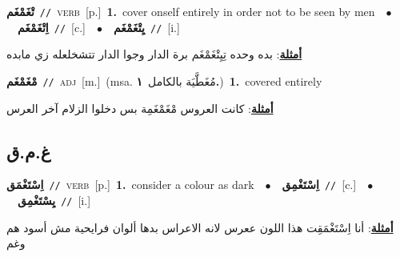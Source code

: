 \documentclass[10pt,a4paper,twoside]{article} %
\begin{document}
\begin{multicols}{2}
{\setlength\topsep{0pt}\textbf{\foreignlanguage{arabic}{تْغَمْغَم}}\ {\color{gray}\texttt{//}\color{black}}\ \textsc{verb}\ [p.]\ \textbf{1.}~cover onself entirely in order not to be seen by men\ \ $\bullet$\ \ \setlength\topsep{0pt}\textbf{\foreignlanguage{arabic}{اِتْغَمْغَم}}\ {\color{gray}\texttt{//}\color{black}}\ [c.]\ \ $\bullet$\ \ \setlength\topsep{0pt}\textbf{\foreignlanguage{arabic}{يِتْغَمْغَم}}\ {\color{gray}\texttt{//}\color{black}}\ [i.]\  \begin{flushright}\color{gray}\foreignlanguage{arabic}{\textbf{\underline{\foreignlanguage{arabic}{أمثلة}}}: بده وحده تِيِتْغَمْغَم برة الدار وجوا الدار تتشخلعله زي مابده}\end{flushright}\color{black}} \vspace{2mm}

{\setlength\topsep{0pt}\textbf{\foreignlanguage{arabic}{مْغَمْغَم}}\ {\color{gray}\texttt{//}\color{black}}\ \textsc{adj}\ [m.]\ \color{gray}(msa. \foreignlanguage{arabic}{مُغَطَّيَة بالكامل}~\foreignlanguage{arabic}{\textbf{١.}})\color{black}\ \textbf{1.}~covered entirely\  \begin{flushright}\color{gray}\foreignlanguage{arabic}{\textbf{\underline{\foreignlanguage{arabic}{أمثلة}}}: كانت العروس مْغَمْغَمِة بس دخلوا الزلام آخر العرس}\end{flushright}\color{black}} \vspace{2mm}

\vspace{-3mm}
\subsection*{\color{blue}\foreignlanguage{arabic}{غ.م.ق}\color{blue}{}} 

{\setlength\topsep{0pt}\textbf{\foreignlanguage{arabic}{اِسْتَغْمَق}}\ {\color{gray}\texttt{//}\color{black}}\ \textsc{verb}\ [p.]\ \textbf{1.}~consider a colour as dark\ \ $\bullet$\ \ \setlength\topsep{0pt}\textbf{\foreignlanguage{arabic}{اِسْتَغْمِق}}\ {\color{gray}\texttt{//}\color{black}}\ [c.]\ \ $\bullet$\ \ \setlength\topsep{0pt}\textbf{\foreignlanguage{arabic}{يِسْتَغْمِق}}\ {\color{gray}\texttt{//}\color{black}}\ [i.]\  \begin{flushright}\color{gray}\foreignlanguage{arabic}{\textbf{\underline{\foreignlanguage{arabic}{أمثلة}}}: أنا اِسْتَغْمَقِت هذا اللون ععرس لانه الاعراس بدها ألوان فرايحية مش أسود هم وغم}\end{flushright}\color{black}} \vspace{2mm}


\end{multicols}
\end{document}
